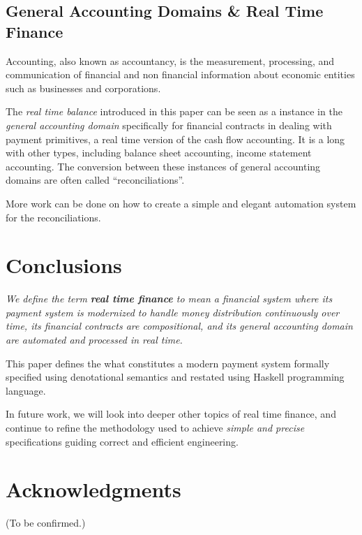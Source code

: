 \subsection{General Accounting Domains \& Real Time Finance}

\begin{displayquote}
Accounting, also known as accountancy, is the measurement, processing, and communication of
financial and non financial information about economic entities such as businesses and
corporations. 
\end{displayquote}

The \textit{real time balance} introduced in this paper can be seen as a instance in
the \textit{general accounting domain} specifically for financial contracts in dealing with payment
primitives, a real time version of the cash flow accounting. It is a long with other types,
including balance sheet accounting, income statement accounting. The conversion between these
instances of general accounting domains are often called ``reconciliations''.

More work can be done on how to create a simple and elegant automation system for the
reconciliations.

\section{Conclusions}

\emph{
We define the term \textbf{real time finance} to mean a financial system where its payment system is
modernized to handle money distribution continuously over time, its financial contracts are
compositional, and its general accounting domain are automated and processed in real time.
}

This paper defines the what constitutes a modern payment system formally specified using
denotational semantics and restated using Haskell programming language.

In future work, we will look into deeper other topics of real time finance, and continue to refine
the methodology used to achieve \textit{simple and precise} specifications guiding correct and
efficient engineering.

\section{Acknowledgments}

(To be confirmed.)

\newpage
\printbibliography{}


